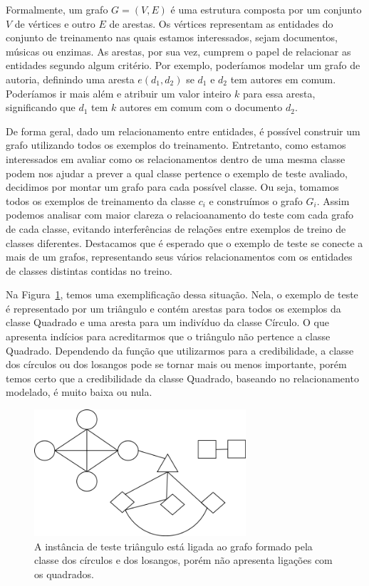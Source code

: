 Formalmente, um grafo $G = (V,E)$ é uma estrutura composta por um conjunto $V$ de vértices e outro $E$ de arestas. Os vértices representam as entidades do conjunto de treinamento nas quais estamos interessados, sejam documentos, músicas ou enzimas. As arestas, por sua vez, cumprem o papel de relacionar as entidades segundo algum critério. Por exemplo, poderíamos modelar um grafo de autoria, definindo uma aresta $e(d_1,d_2)$ se $d_1$ e $d_2$ tem autores em comum. Poderíamos ir mais além e atribuir um valor inteiro $k$ para essa aresta, significando que $d_1$ tem $k$ autores em comum com o documento $d_2$.

De forma geral, dado um relacionamento entre entidades, é possível construir um grafo utilizando todos os exemplos do treinamento. Entretanto, como estamos interessados em avaliar como os relacionamentos dentro de uma mesma classe podem nos ajudar a prever a qual classe pertence o exemplo de teste avaliado, decidimos por montar um grafo para cada possível classe. Ou seja, tomamos todos os exemplos de treinamento da classe $c_i$ e construímos o grafo $G_i$. Assim podemos analisar com maior clareza o relacioanamento do teste com cada grafo de cada classe, evitando interferências de relações entre exemplos de treino de classes diferentes. Destacamos que é esperado que o exemplo de teste se conecte a mais de um grafos, representando seus vários relacionamentos com os entidades de classes distintas contidas no treino.

Na Figura~\ref{fig::grafo}, temos uma exemplificação dessa situação. Nela, o exemplo de teste é representado por um triângulo e contém arestas para todos os exemplos da classe Quadrado e uma aresta para um indivíduo da classe Círculo. O que apresenta indícios para acreditarmos que o triângulo não pertence a classe Quadrado. Dependendo da função que utilizarmos para a credibilidade, a classe dos círculos ou dos losangos pode se tornar mais ou menos importante, porém temos certo que a credibilidade da classe Quadrado, baseando no relacionamento modelado, é muito baixa ou nula.

\begin{figure}[ht!]
\centering
\includegraphics[width=0.7\textwidth]{figures/grafo.png}
\caption{A instância de teste triângulo está ligada ao grafo formado pela classe dos círculos e dos losangos, porém não apresenta ligações com os quadrados.}
\label{fig::grafo}
\end{figure}

